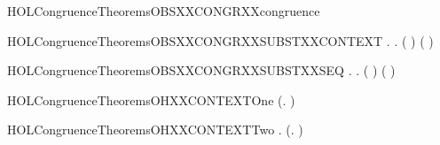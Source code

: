 \newcommand{\HOLCongruenceTheoremsGSEQXXstrongind}{\UseVerbatim{HOLCongruenceTheoremsGSEQXXstrongind}}
\begin{SaveVerbatim}{HOLCongruenceTheoremsOBSXXCONGRXXcongruence}
\HOLTokenTurnstile{}  
\end{SaveVerbatim}
\newcommand{\HOLCongruenceTheoremsOBSXXCONGRXXcongruence}{\UseVerbatim{HOLCongruenceTheoremsOBSXXCONGRXXcongruence}}
\begin{SaveVerbatim}{HOLCongruenceTheoremsOBSXXCONGRXXSUBSTXXCONTEXT}
\HOLTokenTurnstile{} \HOLSymConst{\HOLTokenForall{}} .    \HOLSymConst{\HOLTokenImp{}} \HOLSymConst{\HOLTokenForall{}}.   \HOLSymConst{\HOLTokenImp{}}  ( ) ( )
\end{SaveVerbatim}
\newcommand{\HOLCongruenceTheoremsOBSXXCONGRXXSUBSTXXCONTEXT}{\UseVerbatim{HOLCongruenceTheoremsOBSXXCONGRXXSUBSTXXCONTEXT}}
\begin{SaveVerbatim}{HOLCongruenceTheoremsOBSXXCONGRXXSUBSTXXSEQ}
\HOLTokenTurnstile{} \HOLSymConst{\HOLTokenForall{}} .    \HOLSymConst{\HOLTokenImp{}} \HOLSymConst{\HOLTokenForall{}}.   \HOLSymConst{\HOLTokenImp{}}  ( ) ( )
\end{SaveVerbatim}
\newcommand{\HOLCongruenceTheoremsOBSXXCONGRXXSUBSTXXSEQ}{\UseVerbatim{HOLCongruenceTheoremsOBSXXCONGRXXSUBSTXXSEQ}}
\begin{SaveVerbatim}{HOLCongruenceTheoremsOHXXCONTEXTOne}
\HOLTokenTurnstile{}  (\HOLTokenLambda{}. )
\end{SaveVerbatim}
\newcommand{\HOLCongruenceTheoremsOHXXCONTEXTOne}{\UseVerbatim{HOLCongruenceTheoremsOHXXCONTEXTOne}}
\begin{SaveVerbatim}{HOLCongruenceTheoremsOHXXCONTEXTTwo}
\HOLTokenTurnstile{} \HOLSymConst{\HOLTokenForall{}} .   \HOLSymConst{\HOLTokenImp{}}  (\HOLTokenLambda{}.  )
\end{SaveVerbatim}
\newcommand{\HOLCongruenceTheoremsOHXXCONTEXTTwo}{\UseVerbatim{HOLCongruenceTheoremsOHXXCONTEXTTwo}}
